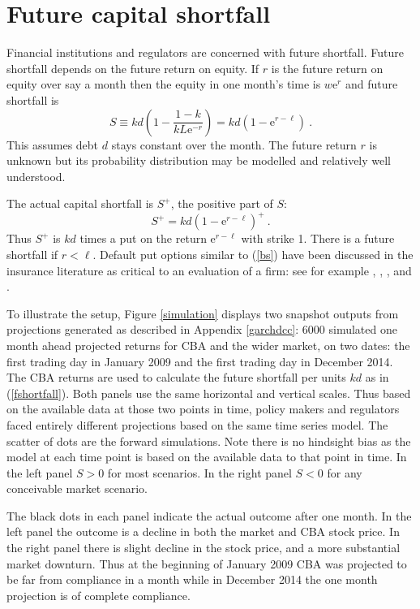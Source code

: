 \documentclass[12pt]{article}
\newcommand{\e}{\mathrm{e}}
\newcommand{\eref}[1]{(\ref{#1})}
\newcommand{\fref}[1]{Figure \ref{#1}}
\newcommand{\aref}[1]{Appendix \ref{#1}}
\newcommand{\be}[1]{\begin{equation}\label{#1}}
\newcommand{\ee}{\end{equation}}
\begin{document}
\section{Future capital shortfall}\label{futshort}

Financial institutions and regulators are concerned with future shortfall.   Future shortfall depends on the future return on equity.   If $r$ is the future return on equity over say a month then the  equity in one month's time is $w\e^r$ and future shortfall is
\be{fshortfall}
  S\equiv k d\left(1-\frac{1-k}{kL\e^{-r}}\right) = kd(1-\e^{r-\ell})\ .
\ee
This assumes debt $d$ stays constant over the month.   The future return $r$ is unknown but its probability distribution may be modelled and relatively well understood.

The actual capital shortfall is $S^+$, the positive part of $S$:
\be{bs}
S^+ = kd (1-\e^{r-\ell})^+\ .
\ee
Thus $S^+$ is $kd$ times a put on the return $\e^{r-\ell}$ with strike 1.  There is a future shortfall if $r<\ell$.  Default put options similar to \eref{bs} have been discussed in the insurance literature as critical to an evaluation of a firm:  see for
example \citet{merton1977analytic}, \citet{doherty1986price}, \citet{cummins1988risk}, \citet{myers2001capital} and \citet{sherris2006solvency}.

To illustrate the setup, \fref{simulation}   displays two snapshot outputs from projections generated as described  in \aref{garchdcc}:  6000  simulated one month ahead projected returns for  CBA and the wider market, on  two dates: the first trading day in January 2009 and the first trading day in December 2014.  The CBA returns are used to calculate the future shortfall per units $kd$ as in \eref{fshortfall}.  Both panels use the same horizontal and vertical scales.   Thus based on the available data at those two points in  time, policy makers and regulators faced entirely different projections based on the same time series model.   The scatter of dots are the forward simulations.  Note there is no hindsight bias as the model at each time point is based on the available data to that point in time.     In the left panel $S>0$ for most scenarios.    In the right panel $S<0$ for any conceivable market scenario.

 The black dots in each panel indicate the actual outcome after one month.    In the left panel the outcome is a decline in both  the market and CBA stock price.    In the right panel there is slight decline in the stock price, and a more substantial market downturn.    Thus at the beginning of January  2009 CBA was projected to be far from compliance in a month while in December 2014 the one month projection is of complete compliance.
\end{document}
